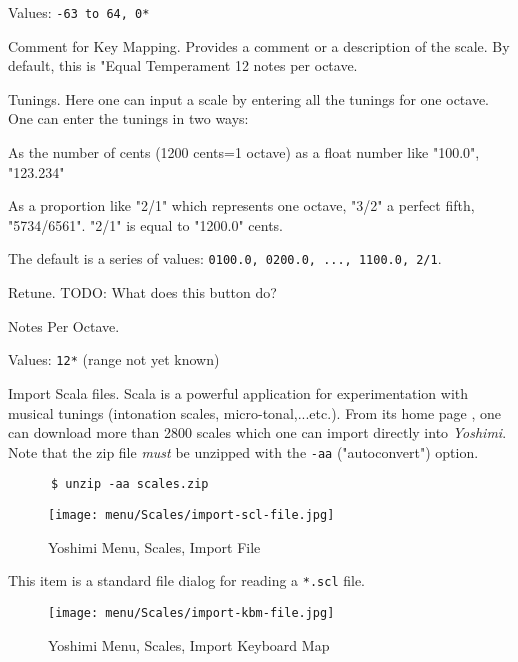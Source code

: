    Values: \texttt{-63 to 64, 0*}

   Comment for Key Mapping.
   Provides a comment or a description of the scale.
   By default, this is "Equal Temperament 12 notes per octave.

   Tunings.
   Here one can input a scale by entering all the tunings for one octave. 
   One can enter the tunings in two ways: 

   \begin{enumber}
      \item As the number of cents (1200 cents=1 octave) as a float number
      like "100.0", "123.234"
      \item As a proportion like "2/1" which represents one octave, "3/2" a
      perfect fifth, "5734/6561".  "2/1" is equal to "1200.0" cents.
   \end{enumber}

   The default is a series of values:
   \texttt{0100.0, 0200.0, ..., 1100.0, 2/1}.

   Retune.
   TODO:  What does this button do?

   Notes Per Octave.

   Values: \texttt{12*} (range not yet known)

   Import Scala files.
   Scala is a powerful application for experimentation with musical tunings
   (intonation scales, micro-tonal,...etc.). From its home page \cite{scala},
   one can download more than 2800 scales which one can import directly into
   \textsl{Yoshimi}.  Note that the zip file \textsl{must} be unzipped with
   the \texttt{-aa} ("autoconvert") option.

    \begin{verbatim}
      $ unzip -aa scales.zip
    \end{verbatim}

\begin{figure}[H]
   \centering 
   \texttt{[image: menu/Scales/import-scl-file.jpg]}
   \caption{Yoshimi Menu, Scales, Import File}
   \label{fig:yoshimi_menu_scales_import_file}
\end{figure}

   This item is a standard file dialog for reading
   a \texttt{*.scl} file.

\begin{figure}[H]
   \centering 
   \texttt{[image: menu/Scales/import-kbm-file.jpg]}
   \caption{Yoshimi Menu, Scales, Import Keyboard Map}
   \label{fig:yoshimi_menu_scales_import_keyboard_map}
\end{figure}

